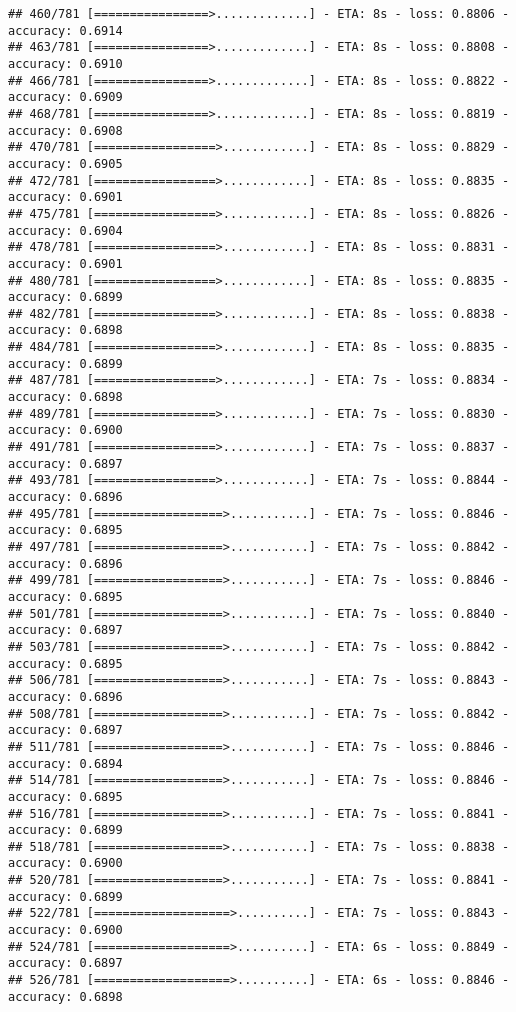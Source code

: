 \documentclass[
]{article}
\begin{document}
\begin{verbatim}
## 460/781 [================>.............] - ETA: 8s - loss: 0.8806 - accuracy: 0.6914
## 463/781 [================>.............] - ETA: 8s - loss: 0.8808 - accuracy: 0.6910
## 466/781 [================>.............] - ETA: 8s - loss: 0.8822 - accuracy: 0.6909
## 468/781 [================>.............] - ETA: 8s - loss: 0.8819 - accuracy: 0.6908
## 470/781 [=================>............] - ETA: 8s - loss: 0.8829 - accuracy: 0.6905
## 472/781 [=================>............] - ETA: 8s - loss: 0.8835 - accuracy: 0.6901
## 475/781 [=================>............] - ETA: 8s - loss: 0.8826 - accuracy: 0.6904
## 478/781 [=================>............] - ETA: 8s - loss: 0.8831 - accuracy: 0.6901
## 480/781 [=================>............] - ETA: 8s - loss: 0.8835 - accuracy: 0.6899
## 482/781 [=================>............] - ETA: 8s - loss: 0.8838 - accuracy: 0.6898
## 484/781 [=================>............] - ETA: 8s - loss: 0.8835 - accuracy: 0.6899
## 487/781 [=================>............] - ETA: 7s - loss: 0.8834 - accuracy: 0.6898
## 489/781 [=================>............] - ETA: 7s - loss: 0.8830 - accuracy: 0.6900
## 491/781 [=================>............] - ETA: 7s - loss: 0.8837 - accuracy: 0.6897
## 493/781 [=================>............] - ETA: 7s - loss: 0.8844 - accuracy: 0.6896
## 495/781 [==================>...........] - ETA: 7s - loss: 0.8846 - accuracy: 0.6895
## 497/781 [==================>...........] - ETA: 7s - loss: 0.8842 - accuracy: 0.6896
## 499/781 [==================>...........] - ETA: 7s - loss: 0.8846 - accuracy: 0.6895
## 501/781 [==================>...........] - ETA: 7s - loss: 0.8840 - accuracy: 0.6897
## 503/781 [==================>...........] - ETA: 7s - loss: 0.8842 - accuracy: 0.6895
## 506/781 [==================>...........] - ETA: 7s - loss: 0.8843 - accuracy: 0.6896
## 508/781 [==================>...........] - ETA: 7s - loss: 0.8842 - accuracy: 0.6897
## 511/781 [==================>...........] - ETA: 7s - loss: 0.8846 - accuracy: 0.6894
## 514/781 [==================>...........] - ETA: 7s - loss: 0.8846 - accuracy: 0.6895
## 516/781 [==================>...........] - ETA: 7s - loss: 0.8841 - accuracy: 0.6899
## 518/781 [==================>...........] - ETA: 7s - loss: 0.8838 - accuracy: 0.6900
## 520/781 [==================>...........] - ETA: 7s - loss: 0.8841 - accuracy: 0.6899
## 522/781 [===================>..........] - ETA: 7s - loss: 0.8843 - accuracy: 0.6900
## 524/781 [===================>..........] - ETA: 6s - loss: 0.8849 - accuracy: 0.6897
## 526/781 [===================>..........] - ETA: 6s - loss: 0.8846 - accuracy: 0.6898

\end{verbatim}
\end{document}
